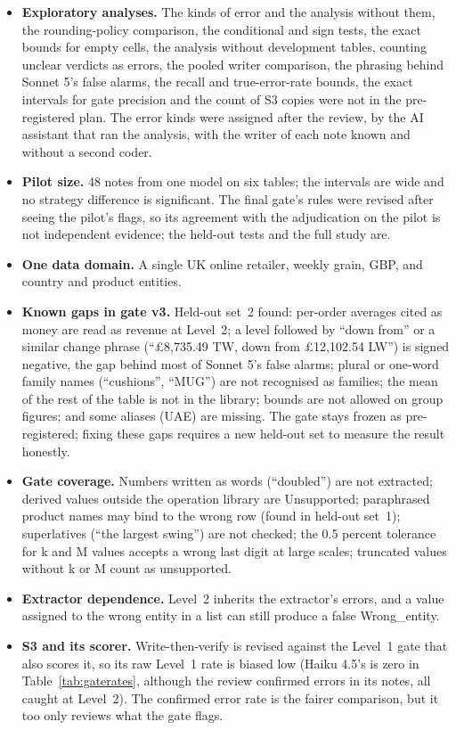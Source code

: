 \documentclass[11pt]{article}
\begin{document}
\begin{itemize}
  \item \textbf{Exploratory analyses.} The kinds of error and the analysis without them, the rounding-policy comparison, the conditional and sign tests, the exact bounds for empty cells, the analysis without development tables, counting unclear verdicts as errors, the pooled writer comparison, the phrasing behind Sonnet 5's false alarms, the recall and true-error-rate bounds, the exact intervals for gate precision and the count of S3 copies were not in the pre-registered plan. The error kinds were assigned after the review, by the AI assistant that ran the analysis, with the writer of each note known and without a second coder.
  \item \textbf{Pilot size.} 48 notes from one model on six tables; the intervals are wide and no strategy difference is significant. The final gate's rules were revised after seeing the pilot's flags, so its agreement with the adjudication on the pilot is not independent evidence; the held-out tests and the full study are.
  \item \textbf{One data domain.} A single UK online retailer, weekly grain, GBP, and country and product entities.
  \item \textbf{Known gaps in gate v3.} Held-out set~2 found: per-order averages cited as money are read as revenue at Level~2; a level followed by ``down from'' or a similar change phrase (``\pounds8,735.49 TW, down from \pounds12,102.54 LW'') is signed negative, the gap behind most of Sonnet 5's false alarms; plural or one-word family names (``cushions'', ``MUG'') are not recognised as families; the mean of the rest of the table is not in the library; bounds are not allowed on group figures; and some aliases (UAE) are missing. The gate stays frozen as pre-registered; fixing these gaps requires a new held-out set to measure the result honestly.
  \item \textbf{Gate coverage.} Numbers written as words (``doubled'') are not extracted; derived values outside the operation library are Unsupported; paraphrased product names may bind to the wrong row (found in held-out set~1); superlatives (``the largest swing'') are not checked; the 0.5 percent tolerance for k and M values accepts a wrong last digit at large scales; truncated values without k or M count as unsupported.
  \item \textbf{Extractor dependence.} Level~2 inherits the extractor's errors, and a value assigned to the wrong entity in a list can still produce a false Wrong\_entity.
  \item \textbf{S3 and its scorer.} Write-then-verify is revised against the Level~1 gate that also scores it, so its raw Level~1 rate is biased low (Haiku 4.5's is zero in Table~\ref{tab:gaterates}, although the review confirmed \ConfNHaikuThree{} errors in its notes, all caught at Level~2). The confirmed error rate is the fairer comparison, but it too only reviews what the gate flags.
\end{itemize}
\end{document}

